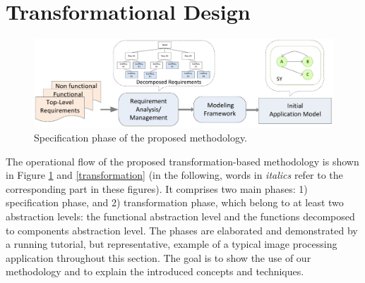 \section{Transformational Design}
\label{sec:transform-methodology}
\begin{figure}[t]
	\centering
	\includegraphics[width=\linewidth]{figs-src/specification.pdf}
	\caption{Specification phase of the proposed methodology.}
	\label{specification}
\end{figure}

The operational flow of the proposed transformation-based methodology is shown in Figure \ref{specification} and \ref{transformation} (in the following, words in \textit{italics} refer to the corresponding part in these figures). It comprises two main phases: 1) specification phase, and 2)  transformation phase, which belong to at least two  abstraction levels: the functional abstraction level and the functions decomposed to components abstraction level. The phases are elaborated and demonstrated by a running tutorial, but representative, example of a typical image processing application throughout this section. The goal is to show the use of our methodology and to explain the introduced concepts and techniques. 


